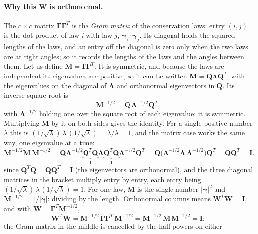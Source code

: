 \documentclass[11pt,a4paper,openany]{report}
\begin{document}
{{\paragraph{Why this $\mathbf{W}$ is orthonormal.} The $c \times c$ matrix
$\mathbf{\Gamma}\mathbf{\Gamma}^T$ is the \emph{Gram matrix} of the
conservation laws: entry $(i, j)$ is the dot product of law $i$ with law
$j$, $\boldsymbol{\gamma}_i \cdot \boldsymbol{\gamma}_j$. Its diagonal holds
the squared lengths of the laws, and an entry off the diagonal is zero only
when the two laws are at right angles; so it records the lengths of the laws
and the angles between them. Let us define $\mathbf{M} = \mathbf{\Gamma}
\mathbf{\Gamma}^T$. It is symmetric, and because the laws are independent
its eigenvalues are positive, so it can be written $\mathbf{M} = \mathbf{Q}
\mathbf{\Lambda} \mathbf{Q}^T$, with the eigenvalues on the diagonal of
$\mathbf{\Lambda}$ and orthonormal eigenvectors in $\mathbf{Q}$. Its inverse
square root is
\[
  \mathbf{M}^{-1/2} = \mathbf{Q}\, \mathbf{\Lambda}^{-1/2} \mathbf{Q}^T ,
\]
with $\mathbf{\Lambda}^{-1/2}$ holding one over the square root of each
eigenvalue; it is symmetric. Multiplying $\mathbf{M}$ by it on both sides
gives the identity. For a single positive number $\lambda$ this is
$(1/\sqrt{\lambda})\, \lambda\, (1/\sqrt{\lambda}) = \lambda / \lambda = 1$,
and the matrix case works the same way, one eigenvalue at a time:
\[
  \mathbf{M}^{-1/2} \mathbf{M}\, \mathbf{M}^{-1/2}
  = \mathbf{Q} \mathbf{\Lambda}^{-1/2} \underbrace{\mathbf{Q}^T
    \mathbf{Q}}_{\mathbf{I}} \mathbf{\Lambda} \underbrace{\mathbf{Q}^T
    \mathbf{Q}}_{\mathbf{I}} \mathbf{\Lambda}^{-1/2} \mathbf{Q}^T
  = \mathbf{Q} \bigl( \mathbf{\Lambda}^{-1/2} \mathbf{\Lambda}\,
    \mathbf{\Lambda}^{-1/2} \bigr) \mathbf{Q}^T
  = \mathbf{Q} \mathbf{Q}^T = \mathbf{I} ,
\]
since $\mathbf{Q}^T \mathbf{Q} = \mathbf{Q} \mathbf{Q}^T = \mathbf{I}$ (the
eigenvectors are orthonormal), and the three diagonal matrices in the
bracket multiply entry by entry, each entry being
$(1/\sqrt{\lambda})\, \lambda\, (1/\sqrt{\lambda}) = 1$. For one law, $\mathbf{M}$ is the single
number $|\boldsymbol{\gamma}|^2$ and $\mathbf{M}^{-1/2} =
1/|\boldsymbol{\gamma}|$: dividing by the length. Orthonormal columns means
$\mathbf{W}^T \mathbf{W} = \mathbf{I}$, and with $\mathbf{W} =
\mathbf{\Gamma}^T \mathbf{M}^{-1/2}$,
\[
  \mathbf{W}^T \mathbf{W}
  = \mathbf{M}^{-1/2}\, \mathbf{\Gamma} \mathbf{\Gamma}^T\, \mathbf{M}^{-1/2}
  = \mathbf{M}^{-1/2}\, \mathbf{M}\, \mathbf{M}^{-1/2} = \mathbf{I} :
\]
the Gram matrix in the middle is cancelled by the half powers on either
}}
\end{document}
